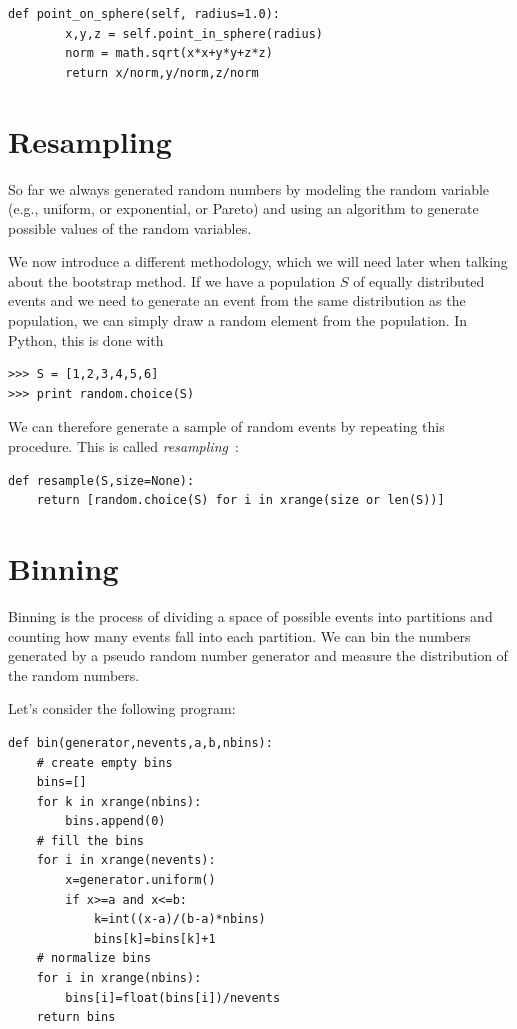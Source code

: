 \documentclass[justified,sixbynine]{tufte-book}
\def\ft{\small\tt}
\theoremstyle{plain}%
\theoremstyle{definition}
\theoremstyle{remark}
\begin{document}
\begin{fullwidth}
\begin{lstlisting}[caption={in file: {\ft nlib.py}}]
    def point_on_sphere(self, radius=1.0):
        x,y,z = self.point_in_sphere(radius)
        norm = math.sqrt(x*x+y*y+z*z)
        return x/norm,y/norm,z/norm
\end{lstlisting}

\section{Resampling}

So far we always generated random numbers by modeling the random variable (e.g., uniform, or exponential, or Pareto) and using an algorithm to generate possible values of the random variables.

We now introduce a different methodology, which we will need later when talking about the bootstrap method.
If we have a population $S$ of equally distributed events and we need to generate an event from the same distribution as the population, we can simply draw a random element from the population. In Python, this is done with

\begin{lstlisting}
>>> S = [1,2,3,4,5,6]
>>> print random.choice(S)
\end{lstlisting}

We can therefore generate a sample of random events by repeating this procedure. This is called {\it resampling}~\cite{resampling}:

\begin{lstlisting}[caption={in file: {\ft nlib.py}}]
def resample(S,size=None):
    return [random.choice(S) for i in xrange(size or len(S))]
\end{lstlisting}

\goodbreak\section{Binning}

Binning is the process of dividing a space of possible events into
partitions and counting how many events fall into each partition. We can bin
the numbers generated by a pseudo random number generator and measure the
distribution of the random numbers.

Let's consider the following program:
\begin{lstlisting}
def bin(generator,nevents,a,b,nbins):
    # create empty bins
    bins=[]
    for k in xrange(nbins):
        bins.append(0)
    # fill the bins
    for i in xrange(nevents):
        x=generator.uniform()
        if x>=a and x<=b:
            k=int((x-a)/(b-a)*nbins)
            bins[k]=bins[k]+1
    # normalize bins
    for i in xrange(nbins):
        bins[i]=float(bins[i])/nevents
    return bins


\end{lstlisting}
\end{fullwidth}
\end{document}
